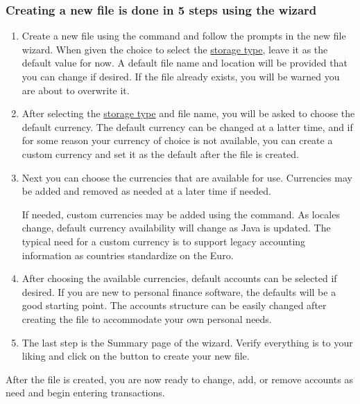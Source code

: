 \documentclass[letterpaper,12pt]{book}
\begin{document}
    \subsubsection*{Creating a new file is done in 5 steps using the wizard}
    \begin{enumerate}
        \item Create a new file using the  command and follow the prompts in the new file wizard.
        When given the choice to select the \hyperref[subsec:fileTypes]{storage type}, leave it as the default value for now.
        A default file name and location will be provided that you can change if desired.
        If the file already exists, you will be warned you are about to overwrite it.
        \item After selecting the \hyperref[subsec:fileTypes]{storage type} and file name, you will be asked to choose
        the default currency.
        The default currency can be changed at a latter time, and if for some reason your currency of choice is not
        available, you can create a custom currency and set it as the default after the file is created.
        \item Next you can choose the currencies that are available for use.
        Currencies may be added and removed as needed at a later time if needed.

        If needed, custom currencies may be added using the  command.
        As locales change, default currency availability will change as Java is updated.
        The typical need for a custom currency is to support legacy accounting information as countries standardize on the Euro.
        \item After choosing the available currencies, default accounts can be selected if desired.
        If you are new to personal finance software, the defaults will be a good starting point.
        The accounts structure can be easily changed after creating the file to accommodate your own personal needs.
        \item The last step is the Summary page of the wizard.
        Verify everything is to your liking and click on the  button to create your new file.
    \end{enumerate}

    After the file is created, you are now ready to change, add, or remove accounts as need and begin entering transactions.
\end{document}
